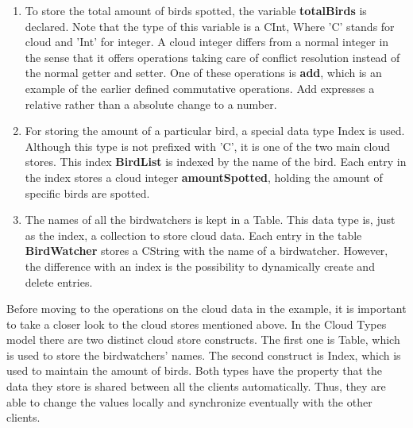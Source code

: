 \documentclass[a4paper,12pt]{report}
\begin{document}
\begin{enumerate}
 \item To store the total amount of birds spotted, the variable \textbf{totalBirds} is declared. Note that the type of this variable is a \textcolor{codedarkblue}{CInt}, Where 'C' stands for cloud and 'Int' for integer. A cloud integer differs from a normal integer in the sense that it offers operations taking care of conflict resolution instead of the normal getter and setter. One of these operations is \textbf{add}, which is an example of the earlier defined commutative operations. Add expresses a relative rather than a absolute change to a number.
 \item For storing the amount of a particular bird, a special data type \textcolor{codeblue}{Index} is used. Although this type is not prefixed with 'C', it is one of the two main cloud stores. This index \textbf{BirdList} is indexed by the name of the bird. Each entry in the index stores a cloud integer \textbf{amountSpotted}, holding the amount of specific birds are spotted. 
 \item The names of all the birdwatchers is kept in a \textcolor{codeblue}{Table}. This data type is, just as the index, a collection to store cloud data. Each entry in the table \textbf{BirdWatcher} stores a \textcolor{codedarkblue}{CString} with the name of a birdwatcher. However, the difference with an index is the possibility to dynamically create and delete entries.
\end{enumerate}

Before moving to the operations on the cloud data in the example, it is important to take a closer look to the cloud stores mentioned above. In the Cloud Types model there are two distinct cloud store constructs. The first one is \textcolor{codedarkblue}{Table}, which is used to store the birdwatchers' names. The second construct is \textcolor{codedarkblue}{Index}, which is used to maintain the amount of birds. Both types have the property that the data they store is shared between all the clients automatically. Thus, they are able to change the values locally and synchronize eventually with the other clients. \\ 
\end{document}
